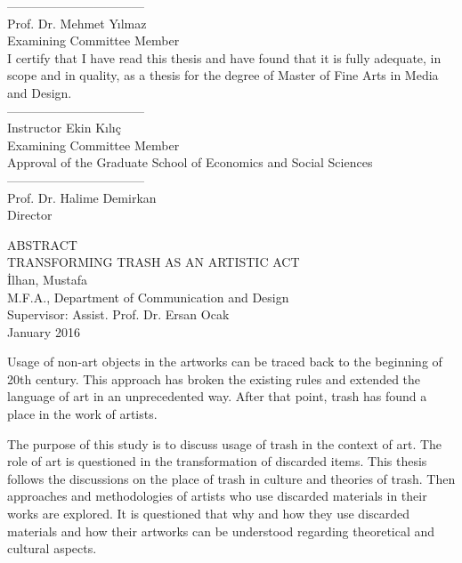 \documentclass[12pt]{report}
\begin{document}
\noindent---------------------------------\\
Prof. Dr. Mehmet Yılmaz\\
Examining Committee Member\\

\noindent I certify that I have read this thesis and have found that it is fully adequate, in scope and in quality, as a thesis for the degree of Master of Fine Arts in Media and Design.\\

\noindent---------------------------------\\
Instructor Ekin Kılıç\\
Examining Committee Member\\

\noindent Approval of the Graduate School of Economics and Social Sciences\\

\noindent---------------------------------\\
Prof. Dr. Halime Demirkan\\
Director\\

\clearpage


\thispagestyle{plain}
{}
\doublespacing
\begin{center}
	\vspace*{25mm}
	\MakeUppercase{Abstract}\\
    \vspace{\baselineskip}
    TRANSFORMING TRASH AS AN ARTISTIC ACT\\
    İlhan, Mustafa\\
    M.F.A., Department of Communication and Design\\
    Supervisor: Assist. Prof. Dr. Ersan Ocak\\
    \vspace{\baselineskip}
    January 2016
\end{center}
\singlespacing
\par Usage of non-art objects in the artworks can be traced back to the beginning of 20th century. This approach has broken the existing rules and extended the language of art in an unprecedented way. After that point, trash has found a place in the work of artists.

The purpose of this study is to discuss usage of trash in the context of art. The role of art is questioned in the transformation of discarded items. This thesis follows the discussions on the place of trash in culture and theories of trash. Then approaches and methodologies of artists who use discarded materials in their works are explored. It is questioned that why and how they use discarded materials and how their artworks can be understood regarding theoretical and cultural aspects.
\end{document}
